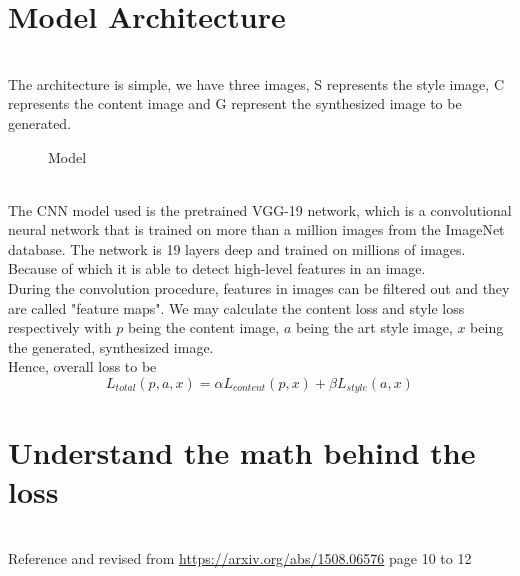\documentclass[11pt, a4paper]{article} %
\begin{document}
\section{Model Architecture}
\\ The architecture is simple, we have three images, S represents the style image, C represents the content image and G represent the synthesized image to be generated.
\begin{figure}[H]
    \centering
    \caption{Model}
\end{figure}
\\ The CNN model used is the pretrained VGG-19 network, which is a convolutional neural network that is trained on more than a million images from the ImageNet database. The network is 19 layers deep and trained on millions of images. Because of which it is able to detect high-level features in an image. 
\\ During the convolution procedure, features in images can be filtered out and they are called "feature maps". We may calculate the content loss and style loss respectively with $p$ being the content image, $a$ being the art style image, $x$ being the generated, synthesized image. 
\\ Hence, overall loss to be {\Large $$L_{total}(p, a, x) = \alpha L_{content}(p, x) + \beta L_{style}(a, x)$$}
\section{Understand the math behind the loss}
\\ Reference and revised from \url{https://arxiv.org/abs/1508.06576} page 10 to 12
\end{document}
